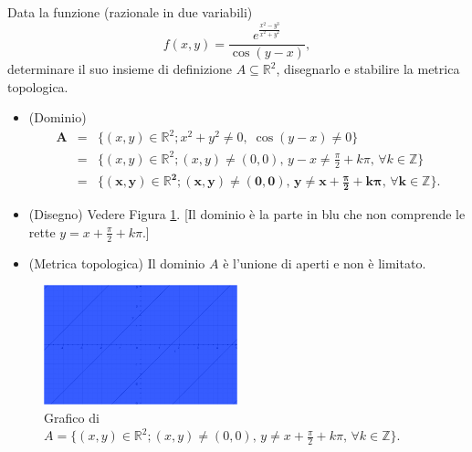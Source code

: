 \begin{example}
    Data la funzione (razionale in due variabili)
    \begin{equation*}
        f(x,y)=\frac{e^{\frac{x^2-y^3}{x^2+y^2}}}{\cos(y-x)},
    \end{equation*}
    determinare il suo insieme di definizione $A\subseteq\mathbb R^2$, disegnarlo e stabilire la metrica topologica.
    \begin{itemize}
        \item (Dominio)
        \begin{equation*}
            \begin{matrix}
                \boldsymbol A&=&\{(x,y)\in\mathbb R^2;x^2+y^2\neq 0,\; \cos(y-x)\neq 0\}\\
                &=&\{(x,y)\in\mathbb R^2;(x,y)\neq(0,0),\, y-x\neq \frac{\pi}{2}+k\pi,\, \forall k\in\mathbb Z\}\\
                &=&\boldsymbol{\{(x,y)\in\mathbb R^2;(x,y)\neq(0,0),\, y\neq x + \frac{\pi}{2}+k\pi,\, \forall k\in\mathbb Z\}}.
            \end{matrix}
        \end{equation*}
        \item (Disegno) Vedere Figura \ref{fig:esempio_dominio_analisi2}. [Il dominio è la parte in blu che non comprende le rette $y=x+\frac{\pi}{2}+k\pi$.]
        \item (Metrica topologica) Il dominio $A$ è l'unione di aperti e non è limitato.
    \end{itemize}
    \begin{figure}
    \centering
    \includegraphics[width=0.5\textwidth]{Analisi2/figures/A_dom.jpg}
    \caption{Grafico di $A=\{(x,y)\in\mathbb R^2;(x,y)\neq(0,0),\, y\neq x + \frac{\pi}{2}+k\pi,\, \forall k\in\mathbb Z\}$.}\label{fig:esempio_dominio_analisi2}
    \end{figure}
\end{example}

